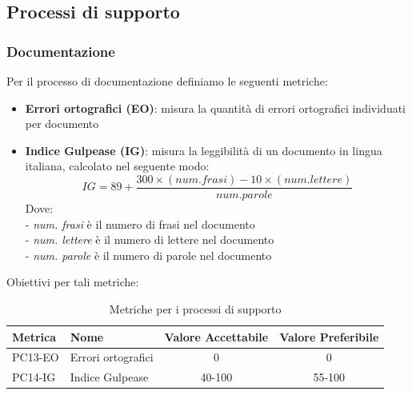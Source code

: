 \documentclass[a4paper,10pt]{article}
\begin{document}
\subsection{Processi di supporto}
\subsubsection{Documentazione} 
Per il processo di documentazione definiamo le seguenti metriche:
\begin{itemize}
    \item \textbf{Errori ortografici (EO)}: misura la quantità di errori ortografici individuati per documento
    \item \textbf{Indice Gulpease (IG)}: misura la leggibilità di un documento in lingua italiana, calcolato nel seguente modo:
        \[
        IG = 89 + \frac{300 \times (num. frasi) - 10 \times (num. lettere) }{num. parole}
        \]
    Dove: \\
    - \textit{num. frasi} è il numero di frasi nel documento \\
    - \textit{num. lettere} è il numero di lettere nel documento \\
    - \textit{num. parole} è il numero di parole nel documento
\end{itemize}
Obiettivi per tali metriche:
\begin{table}[H]
\centering
\renewcommand{\arraystretch}{1.2}
\begin{tabular}{|l|l|c|c|}
\hline
\textbf{Metrica} & \textbf{Nome} & \textbf{Valore Accettabile} & \textbf{Valore Preferibile} \\
\hline
PC13-EO & Errori ortografici & 0 & 0 \\
PC14-IG  & Indice Gulpease & 40-100      & 55-100 \\
\hline
\end{tabular}
\caption{Metriche per i processi di supporto}
\label{tab:metriche-supporto}
\end{table}
\end{document}
